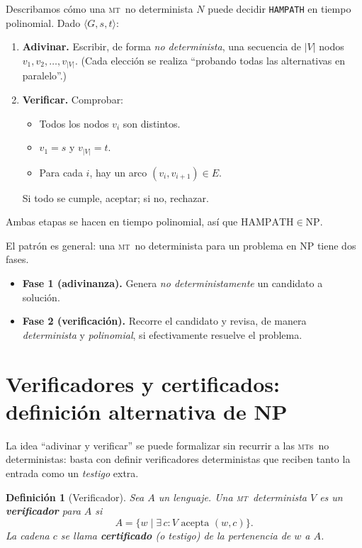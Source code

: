 \documentclass[11pt,a4paper]{article}
\theoremstyle{definicion}
\newtheorem{definicion}{Definición}[section]
\newcommand{\MT}{\textsc{mt}}
\newcommand{\MTs}{\textsc{mt}s}
\newcommand{\enc}[1]{\langle #1 \rangle}
\newcommand{\NP}{\mathrm{NP}}
\begin{document}
Describamos cómo una \MT\ no determinista $N$ puede decidir \texttt{HAMPATH} en tiempo polinomial. Dado $\enc{G, s, t}$:
\begin{enumerate}
    \item \textbf{Adivinar.} Escribir, de forma \emph{no determinista}, una secuencia de $|V|$ nodos $v_1, v_2, \dots, v_{|V|}$. (Cada elección se realiza ``probando todas las alternativas en paralelo''.)
    \item \textbf{Verificar.} Comprobar:
    \begin{itemize}
        \item Todos los nodos $v_i$ son distintos.
        \item $v_1 = s$ y $v_{|V|} = t$.
        \item Para cada $i$, hay un arco $(v_i, v_{i+1}) \in E$.
    \end{itemize}
    Si todo se cumple, aceptar; si no, rechazar.
\end{enumerate}

Ambas etapas se hacen en tiempo polinomial, así que $\mathrm{HAMPATH} \in \NP$.

\begin{idea}
El patrón es general: una \MT\ no determinista para un problema en $\NP$ tiene dos fases.
\begin{itemize}
    \item \textbf{Fase 1 (adivinanza).} Genera \emph{no deterministamente} un candidato a solución.
    \item \textbf{Fase 2 (verificación).} Recorre el candidato y revisa, de manera \emph{determinista} y \emph{polinomial}, si efectivamente resuelve el problema.
\end{itemize}
\end{idea}

\section{Verificadores y certificados: definición alternativa de NP}

La idea ``adivinar y verificar'' se puede formalizar sin recurrir a las \MTs\ no deterministas: basta con definir verificadores deterministas que reciben tanto la entrada como un \emph{testigo} extra.

\begin{definicion}[Verificador]
Sea $A$ un lenguaje. Una \MT\ determinista $V$ es un \textbf{verificador} para $A$ si
\[
A = \{ w \mid \exists\, c : V \text{ acepta } (w, c)\}.
\]
La cadena $c$ se llama \textbf{certificado} (o testigo) de la pertenencia de $w$ a $A$.
\end{definicion}
\end{document}

